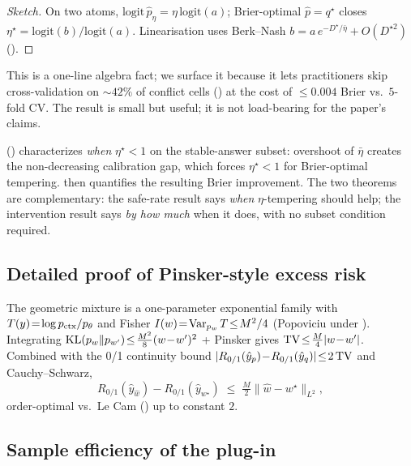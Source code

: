 \begin{proof}[Sketch]
On two atoms, $\mathrm{logit}\,\hat p_\eta\!=\!\eta\,\mathrm{logit}(a)$;
Brier-optimal $\hat p\!=\!q^\star$ closes
$\eta^\star\!=\!\mathrm{logit}(b)/\mathrm{logit}(a)$.  Linearisation
uses Berk--Nash $b\!=\!a\,e^{-D^\star/\bar\eta}+O(D^{\star 2})$
().
\end{proof}

This is a one-line algebra fact; we surface it because it lets
practitioners skip cross-validation on $\sim\!42\%$ of conflict
cells () at the cost of
$\le\!0.004$ Brier vs.\ $5$-fold CV.  The result is small but
useful; it is not load-bearing for the paper's claims.

\begin{remark}
 () characterizes
\emph{when} $\eta^\star\!<\!1$ on the stable-answer subset:
overshoot of $\bar\eta$ creates the non-decreasing calibration
gap, which forces $\eta^\star\!<\!1$ for Brier-optimal tempering.
 then quantifies the resulting Brier
improvement.  The two theorems are complementary: the safe-rate
result says \emph{when} $\eta$-tempering should help; the
intervention result says \emph{by how much} when it does, with no
subset condition required.
\end{remark}


\subsection{Detailed proof of Pinsker-style excess risk}
\label{app:pinsker-detail}

The geometric mixture is a one-parameter exponential family with
$T(y)\!=\!\log p_{\mathrm{ctx}}/p_\theta$ and Fisher
$I(w)\!=\!\operatorname{Var}_{p_w}T\!\le\!M^2/4$ (Popoviciu under
).  Integrating
$\operatorname{KL}(p_w\|p_{w'})\!\le\!\tfrac{M^2}{8}(w\!-\!w')^2$ + Pinsker
gives $\operatorname{TV}\!\le\!\tfrac{M}{4}|w\!-\!w'|$.  Combined with the 0/1
continuity bound $|R_{0/1}(\hat y_p)\!-\!R_{0/1}(\hat y_q)|\!\le\!2\operatorname{TV}$
and Cauchy--Schwarz,
\begin{equation}
R_{0/1}(\hat y_{\hat w})-R_{0/1}(\hat y_{w^\star})\;\le\;\tfrac{M}{2}\|\hat w-w^\star\|_{L^2},
\label{eq:tight-excess-risk}
\end{equation}
order-optimal vs.\ Le Cam () up to constant $2$.


\subsection{Sample efficiency of the plug-in}
\label{app:sample-efficiency}


